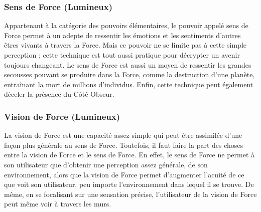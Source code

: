 \subsubsection{Sens de Force (Lumineux)}
Appartenant à la catégorie des pouvoirs élémentaires, le pouvoir appelé sens de Force permet à un adepte de ressentir les émotions et les sentiments d’autres êtres vivants à travers la Force. Mais ce pouvoir ne se limite pas à cette simple perception ; cette technique est tout aussi pratique pour décrypter un avenir toujours changeant. Le sens de Force est aussi un moyen de ressentir les grandes secousses pouvant se produire dans la Force, comme la destruction d’une planète, entraînant la mort de millions d’individus. Enfin, cette technique peut également déceler la présence du Côté Obscur. 

\subsubsection{Vision de Force (Lumineux)}
La vision de Force est une capacité assez simple qui peut être assimilée d’une façon plus générale au sens de Force. Toutefois, il faut faire la part des choses entre la vision de Force et le sens de Force. En effet, le sens de Force ne permet à son utilisateur que d’obtenir une perception assez générale, de son environnement, alors que la vision de Force permet d’augmenter l’acuité de ce que voit son utilisateur, peu importe l’environnement dans lequel il se trouve. De même, en se focalisant sur une sensation précise, l’utilisateur de la vision de Force peut même voir à travers les murs. 